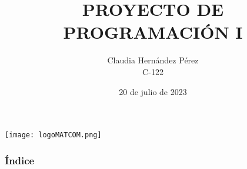 \documentclass{beamer}
\title[Moogle!]{\textbf{PROYECTO DE PROGRAMACIÓN I}}
\author[Claudia Hernández Pérez]{Claudia Hernández Pérez \\ C-122}
\institute[MATCOM]{Facultad de Matemática y Computación}
\date{20 de julio de 2023}
\begin{document}
    \frame
    {
        \begin{flushright}
            \texttt{[image: logoMATCOM.png]}
        \end{flushright}    
        \titlepage 
    }   

    \begin{frame}
        \frametitle{Índice}
        \tableofcontents
    \end{frame}

    
    
    
    
\end{document}
